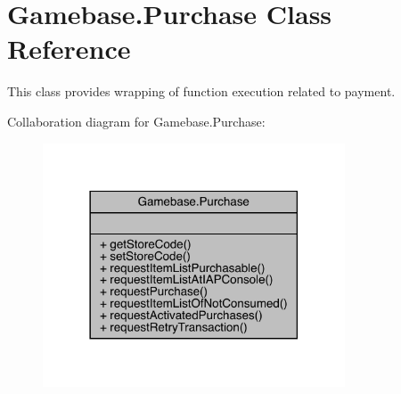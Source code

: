 \hypertarget{classcom_1_1toast_1_1android_1_1gamebase_1_1_gamebase_1_1_purchase}{}\section{Gamebase.\+Purchase Class Reference}
\label{classcom_1_1toast_1_1android_1_1gamebase_1_1_gamebase_1_1_purchase}


This class provides wrapping of function execution related to payment.  




Collaboration diagram for Gamebase.\+Purchase\+:
\nopagebreak
\begin{figure}[H]
\begin{center}
\leavevmode
\includegraphics[width=254pt]{classcom_1_1toast_1_1android_1_1gamebase_1_1_gamebase_1_1_purchase__coll__graph}
\end{center}
\end{figure}
